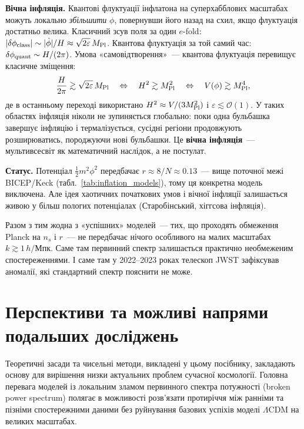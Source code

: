 \documentclass[12pt, a4paper]{article}
\begin{document}
\textbf{Вічна інфляція.} Квантові флуктуації інфлатона на
суперхабблових масштабах можуть локально \emph{збільшити} $\phi$,
повернувши його назад на схил, якщо флуктуація достатньо велика.
Класичний зсув поля за один $e$-fold: $|\delta\phi_{\rm class}|
\sim |\dot\phi|/H \approx \sqrt{2\varepsilon}\,M_{\rm Pl}$.
Квантова флуктуація за той самий час: $\delta\phi_{\rm quant}
\sim H/(2\pi)$. Умова «самовідтворення»~---
квантова флуктуація перевищує класичне зміщення:
\begin{equation*}
  \frac{H}{2\pi} \gtrsim \sqrt{2\varepsilon}\,M_{\rm Pl}
  \quad\Leftrightarrow\quad
  H^2 \gtrsim M_{\rm Pl}^2
  \quad\Leftrightarrow\quad
  V(\phi) \gtrsim M_{\rm Pl}^4,
\end{equation*}
де в останньому переході використано $H^2 \approx V/(3M_{\rm Pl}^2)$
і $\varepsilon \lesssim \mathcal{O}(1)$.
У таких областях інфляція ніколи не зупиняється глобально:
поки одна бульбашка завершує інфляцію і термалізується,
сусідні регіони продовжують розширюватись, породжуючи нові
бульбашки. Це \textbf{вічна інфляція}~--- мультивсесвіт
як математичний наслідок, а не постулат.

\textbf{Статус.} Потенціал $\tfrac{1}{2}m^2\phi^2$ передбачає
$r \approx 8/N \approx 0.13$~--- вище поточної межі BICEP/Keck
(табл.~\ref{tab:inflation_models}), тому ця конкретна модель
виключена. Але ідея хаотичних початкових умов і вічної інфляції
залишається живою у більш пологих потенціалах (Старобінський,
хіггсова інфляція).

Разом з тим жодна з «успішних» моделей~--- тих, що проходять
обмеження Planck на $n_s$ і $r$~--- не передбачає нічого
особливого на малих масштабах $k \gtrsim 1\,h/$Мпк. Саме там
первинний спектр залишається практично необмеженим
спостереженнями. І саме там у 2022--2023 роках телескоп JWST
зафіксував аномалії, які стандартний спектр пояснити не може.


\section{Перспективи та можливі напрями подальших досліджень}
\label{sec:future_research}

Теоретичні засади та чисельні методи, викладені у цьому посібнику, закладають основу для вирішення низки актуальних проблем сучасної космології. Головна перевага моделей із локальним зламом первинного спектра потужності (broken power spectrum) полягає в можливості розв'язати протиріччя між ранніми та пізніми спостережними даними без руйнування базових успіхів моделі $\Lambda$CDM на великих масштабах.
\end{document}

